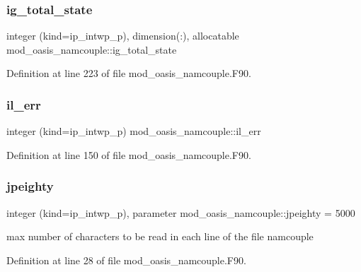 \subsubsection{\texorpdfstring{ig\+\_\+total\+\_\+state}{ig\_total\_state}}
{\footnotesize\ttfamily integer (kind=ip\+\_\+intwp\+\_\+p), dimension(\+:), allocatable mod\+\_\+oasis\+\_\+namcouple\+::ig\+\_\+total\+\_\+state\hspace{0.3cm}{\ttfamily [private]}}



Definition at line 223 of file mod\+\_\+oasis\+\_\+namcouple.\+F90.

\mbox{\label{namespacemod__oasis__namcouple_a18b7a14f095f3cb6ace40afc06e2a5b9}} 
\subsubsection{\texorpdfstring{il\+\_\+err}{il\_err}}
{\footnotesize\ttfamily integer (kind=ip\+\_\+intwp\+\_\+p) mod\+\_\+oasis\+\_\+namcouple\+::il\+\_\+err\hspace{0.3cm}{\ttfamily [private]}}



Definition at line 150 of file mod\+\_\+oasis\+\_\+namcouple.\+F90.

\mbox{\label{namespacemod__oasis__namcouple_a4fb10ad6e864dcbe34c4a8b02204a523}} 
\subsubsection{\texorpdfstring{jpeighty}{jpeighty}}
{\footnotesize\ttfamily integer (kind=ip\+\_\+intwp\+\_\+p), parameter mod\+\_\+oasis\+\_\+namcouple\+::jpeighty = 5000\hspace{0.3cm}{\ttfamily [private]}}



max number of characters to be read in each line of the file namcouple 



Definition at line 28 of file mod\+\_\+oasis\+\_\+namcouple.\+F90.

